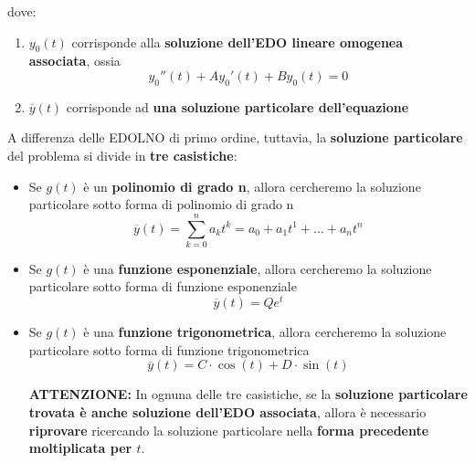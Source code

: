 \documentclass[a4paper, 12pt]{report}
\begin{document}
    dove:
    
    \begin{enumerate}
        \item $y_0(t)$ corrisponde alla \textbf{soluzione dell'EDO lineare omogenea associata}, ossia
        \[ y_0''(t)+Ay_0'(t)+By_0(t) = 0\]
        
        \item $\overline{y}(t)$ corrisponde ad \textbf{una soluzione particolare dell'equazione}
    \end{enumerate}
    
    A differenza delle EDOLNO di primo ordine, tuttavia, la \textbf{soluzione particolare} del problema si divide in \textbf{tre casistiche}:
    
    \begin{itemize}
        \item Se $g(t)$ è un \textbf{polinomio di grado n}, allora cercheremo la soluzione particolare sotto forma di polinomio di grado n
        \[ \overline{y}(t) = \sum_{k=0}^{n} a_k t^k = a_0 + a_1 t^1 + ... + a_n t^n \]
        
        \item Se $g(t)$ è una \textbf{funzione esponenziale}, allora cercheremo la soluzione particolare sotto forma di funzione esponenziale
        \[ \overline{y}(t) = Qe^{t} \]
        
        \item Se $g(t)$ è una \textbf{funzione trigonometrica}, allora cercheremo la soluzione particolare sotto forma di funzione trigonometrica
        \[ \overline{y}(t) = C \cdot \cos(t) + D \cdot \sin(t)\]

        \textbf{ATTENZIONE:} In ognuna delle tre casistiche, se la \textbf{soluzione particolare trovata è anche soluzione dell'EDO associata}, allora è necessario \textbf{riprovare} ricercando la soluzione particolare nella \textbf{forma precedente moltiplicata per $t$}.
        
    \end{itemize}
    
    \newpage
    
\end{document}
